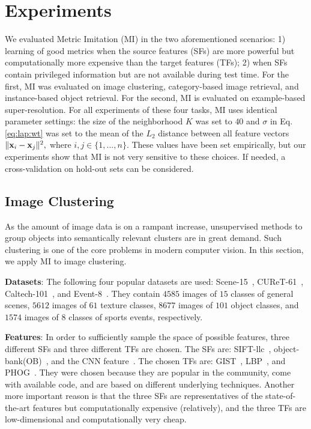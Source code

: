 \documentclass[10pt,twocolumn,letterpaper]{article}
\begin{document}

\section{Experiments} 
\label{sec:exp}

We evaluated Metric Imitation (MI) in the two aforementioned
scenarios: 1) learning of good metrics when the source
features (SFs) are more powerful but computationally more expensive
than the target features (TFs); 2) when SFs contain privileged
information but are not available during test time. For the first, MI
was evaluated on image clustering, category-based image retrieval, and
instance-based object retrieval. For the second, MI is evaluated on
example-based super-resolution. For all experiments of these four
tasks, MI uses identical parameter settings: the size of the
neighborhood $K$ was set to $40$ and $\sigma$ in Eq.\ref{eq:lap:wt}
was set to the mean of the $L_2$ distance between all feature vectors $\|
{\mathbf x}_i - {\mathbf x}_j \|^2, $ where $i, j \in \{1, ..., n \}$. These
values have been set empirically, but our experiments show that MI is
not very sensitive to these choices. If needed, a cross-validation on
hold-out sets can be considered.



\subsection{Image Clustering}
\label{sec:img:clustering}
As the amount of image data is on a rampant increase, unsupervised 
methods to group objects into semantically relevant clusters are in 
great demand. Such clustering is one of the core problems in modern
computer vision. In this section, we apply MI to image clustering.

\textbf{Datasets}: The following four popular datasets are used:
Scene-15~\cite{lazebnik:cvpr06}, CUReT-61~\cite{CUReT-61},
Caltech-101~\cite{FeiFei2004}, and Event-8~\cite{event8}. They contain
$4585$ images of $15$ classes of general scenes, $5612$ images of $61$
texture classes, $8677$ images of $101$ object classes, and $1574$
images of $8$ classes of sports events, respectively.

\textbf{Features}: In order to sufficiently sample the space of
possible features, three different SFs and three different TFs are
chosen. The SFs are: SIFT-llc~\cite{siftllc:cvpr10},
object-bank(OB)~\cite{objectbank:nips10}, and the CNN
feature~\cite{deep:bmvc14}. The chosen TFs are: GIST~\cite{gist},
LBP~\cite{lbp}, and PHOG~\cite{phog}. They were chosen because they
are popular in the community, come with available code, and are based
on different underlying techniques. Another more important reason is
that the three SFs are representatives of the state-of-the-art
features but computationally expensive (relatively), and the three TFs
are low-dimensional and computationally very cheap.
\end{document}
